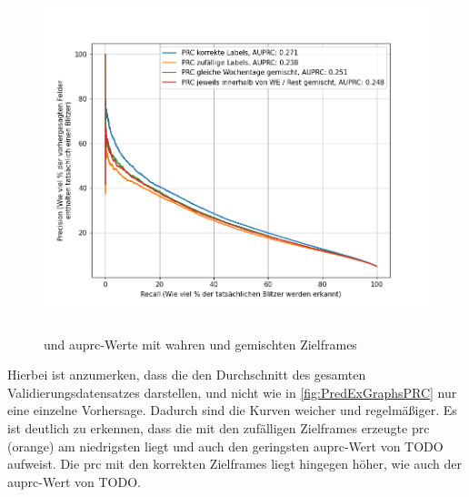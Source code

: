 \begin{figure}[h]
    \centering
    \includegraphics[width=1.0\textwidth,height=10cm,keepaspectratio=true]{content/images/PRCValGetrennt.png}
    \caption{ und \acrshort{auprc}-Werte mit wahren und gemischten Zielframes}
    \label{fig:PRCValGetrennt}
\end{figure}

Hierbei ist anzumerken, dass die  den Durchschnitt des gesamten Validierungsdatensatzes darstellen, und nicht wie in \autoref{fig:PredExGraphsPRC} nur eine einzelne Vorhersage.
Dadurch sind die Kurven weicher und regelmäßiger.
Es ist deutlich zu erkennen, dass die mit den zufälligen Zielframes erzeugte \acrshort{prc} (orange) am niedrigsten liegt und auch den geringsten \acrshort{auprc}-Wert von TODO aufweist.
Die \acrshort{prc} mit den korrekten Zielframes liegt hingegen höher, wie auch der \acrshort{auprc}-Wert von TODO.

